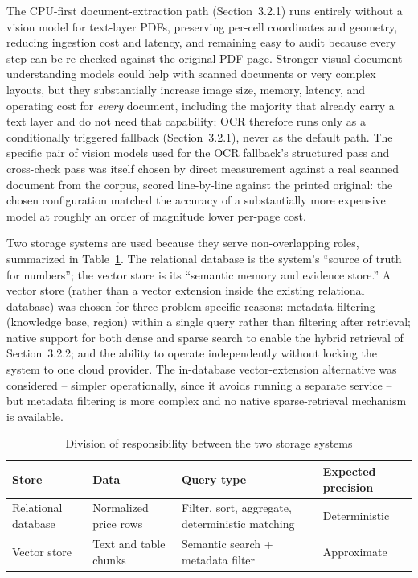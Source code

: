 \documentclass[11pt,a4paper]{article}
\begin{document}
The CPU-first document-extraction path (Section~3.2.1) runs entirely without
a vision model for text-layer PDFs, preserving per-cell coordinates and
geometry, reducing ingestion cost and latency, and remaining easy to audit
because every step can be re-checked against the original PDF page. Stronger
visual document-understanding models could help with scanned documents or
very complex layouts, but they substantially increase image size, memory,
latency, and operating cost for \emph{every} document, including the
majority that already carry a text layer and do not need that capability;
OCR therefore runs only as a conditionally triggered fallback
(Section~3.2.1), never as the default path. The specific pair of vision
models used for the OCR fallback's structured pass and cross-check pass was
itself chosen by direct measurement against a real scanned document from the
corpus, scored line-by-line against the printed original: the chosen
configuration matched the accuracy of a substantially more expensive model
at roughly an order of magnitude lower per-page cost.

Two storage systems are used because they serve non-overlapping roles,
summarized in Table~\ref{tab:storage-roles}. The relational database is the
system's ``source of truth for numbers''; the vector store is its ``semantic
memory and evidence store.'' A vector store (rather than a vector extension
inside the existing relational database) was chosen for three
problem-specific reasons: metadata filtering (knowledge base, region) within
a single query rather than filtering after retrieval; native support for
both dense and sparse search to enable the hybrid retrieval of
Section~3.2.2; and the ability to operate independently without locking the
system to one cloud provider. The in-database vector-extension alternative
was considered -- simpler operationally, since it avoids running a
separate service -- but metadata filtering is more complex and no native
sparse-retrieval mechanism is available.

\begin{table}[htbp]
\centering
\caption{Division of responsibility between the two storage systems}
\label{tab:storage-roles}
\small
\renewcommand{\arraystretch}{1.3}
\begin{tabularx}{\textwidth}{|p{}|X|X|p{}|}
\hline
\rowcolor{tableheader}
\textbf{Store} & \textbf{Data} & \textbf{Query type} & \textbf{Expected precision} \\
\hline
Relational database & Normalized price rows & Filter, sort, aggregate,
deterministic matching & Deterministic \\
\hline
Vector store & Text and table chunks & Semantic search + metadata filter &
Approximate \\
\hline
\end{tabularx}
\end{table}
\FloatBarrier
\end{document}
